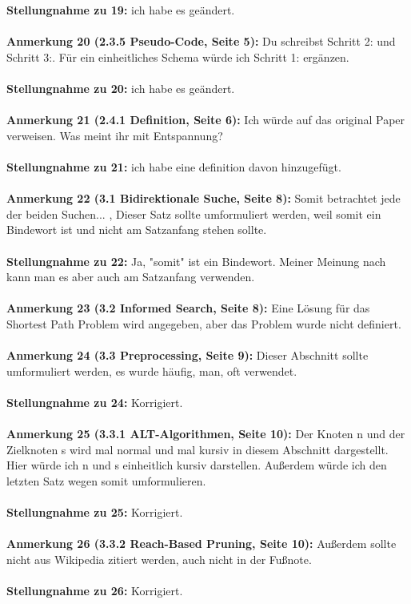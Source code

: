\documentclass[a4paper,12pt]{book}
\begin{document}
\textbf{Stellungnahme zu 19:} ich habe es geändert.
\\ \\
\textbf{Anmerkung 20 (2.3.5 Pseudo-Code, Seite 5):}
Du schreibst Schritt 2: und Schritt 3:. Für ein einheitliches Schema würde ich Schritt 1: ergänzen.
 \\  \\
\textbf{Stellungnahme zu 20:} ich habe es geändert.
\\ \\
\textbf{Anmerkung 21 (2.4.1 Definition, Seite 6):}
Ich würde auf das original Paper verweisen. 
Was meint ihr mit Entspannung?
 \\  \\
\textbf{Stellungnahme zu 21:} ich habe eine definition davon hinzugefügt.
\\ \\
\textbf{Anmerkung 22 (3.1 Bidirektionale Suche, Seite 8):}
\grqq Somit betrachtet jede der beiden Suchen... \glqq{}, Dieser Satz sollte umformuliert werden, weil somit ein Bindewort ist und nicht am Satzanfang stehen sollte. 
\\ \\
\textbf{Stellungnahme zu 22:}
Ja, "somit" ist ein Bindewort. Meiner Meinung nach kann man es aber auch am Satzanfang verwenden.
\\ \\
\textbf{Anmerkung 23 (3.2 Informed Search, Seite 8):}
Eine Lösung für das Shortest Path Problem wird angegeben, aber das Problem wurde nicht definiert.
\\ \\
\textbf{Anmerkung 24 (3.3 Preprocessing, Seite 9):} 
Dieser Abschnitt sollte umformuliert werden, es wurde \glqq häufig, man, oft\grqq{} verwendet. 
\\ \\
\textbf{Stellungnahme zu 24:}
Korrigiert. 
\\ \\
\textbf{Anmerkung 25 (3.3.1 ALT-Algorithmen, Seite 10):}
Der Knoten n und der Zielknoten s wird mal normal und mal kursiv in diesem Abschnitt dargestellt. Hier würde ich n und s einheitlich kursiv darstellen. Außerdem würde ich den letzten Satz wegen \glqq somit\grqq{} umformulieren.
\\ \\
\textbf{Stellungnahme zu 25:}
Korrigiert.
\\ \\
\textbf{Anmerkung 26 (3.3.2 Reach-Based Pruning, Seite 10):}
Außerdem sollte nicht aus Wikipedia zitiert werden, auch nicht in der Fußnote.
\\ \\
\textbf{Stellungnahme zu 26:}
Korrigiert.
\end{document}
